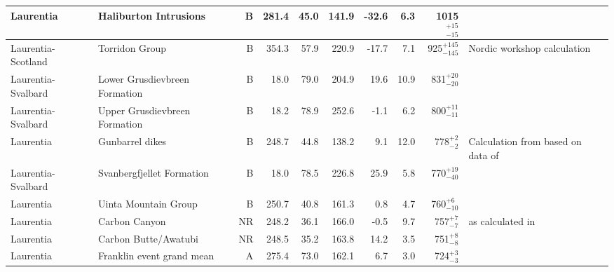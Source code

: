 \begin{longtable}{p{1 in}p{1 in}rrrrrrrp{1.5 in}}
                     Laurentia &                            Haliburton Intrusions &      B &     281.4 &      45.0 & 141.9 & -32.6 &       6.3 &   1015$^{+15}_{-15}$ &                                \cite{Warnock2000a} \\ \hline
            Laurentia-Scotland &                                   Torridon Group &      B &     354.3 &      57.9 & 220.9 & -17.7 &       7.1 &  925$^{+145}_{-145}$ &                        Nordic workshop calculation \\ \hline
            Laurentia-Svalbard &                    Lower Grusdievbreen Formation &      B &      18.0 &      79.0 & 204.9 &  19.6 &      10.9 &    831$^{+20}_{-20}$ &                                 \cite{Maloof2006a} \\ \hline
            Laurentia-Svalbard &                    Upper Grusdievbreen Formation &      B &      18.2 &      78.9 & 252.6 &  -1.1 &       6.2 &    800$^{+11}_{-11}$ &                                 \cite{Maloof2006a} \\ \hline
            Laurentia &                                  Gunbarrel dikes &      B &     248.7 &      44.8 & 138.2 &   9.1 &      12.0 &      778$^{+2}_{-2}$ &  Calculation from \cite{Eyster2019a} based on data of \cite{Harlan1993a, Harlan1997a}  \\ \hline
   Laurentia-Svalbard &                        Svanbergfjellet Formation &      B &      18.0 &      78.5 & 226.8 &  25.9 &       5.8 &    770$^{+19}_{-40}$ &                                 \cite{Maloof2006a} \\ \hline
            Laurentia &                             Uinta Mountain Group &      B &     250.7 &      40.8 & 161.3 &   0.8 &       4.7 &     760$^{+6}_{-10}$ &                                   \cite{Weil2006b} \\ \hline
            Laurentia &                                    Carbon Canyon &     NR &     248.2 &      36.1 & 166.0 &  -0.5 &       9.7 &      757$^{+7}_{-7}$ &  \cite{Weil2004a} as calculated in \cite{Eyster2019a} \\ \hline
            Laurentia &                             Carbon Butte/Awatubi &     NR &     248.5 &      35.2 & 163.8 &  14.2 &       3.5 &      751$^{+8}_{-8}$ &                                 \cite{Eyster2019a} \\ \hline
            Laurentia &                        Franklin event grand mean &      A &     275.4 &      73.0 & 162.1 &   6.7 &       3.0 &      724$^{+3}_{-3}$ &                               \cite{Denyszyn2009a} \\ \hline

\end{longtable}
